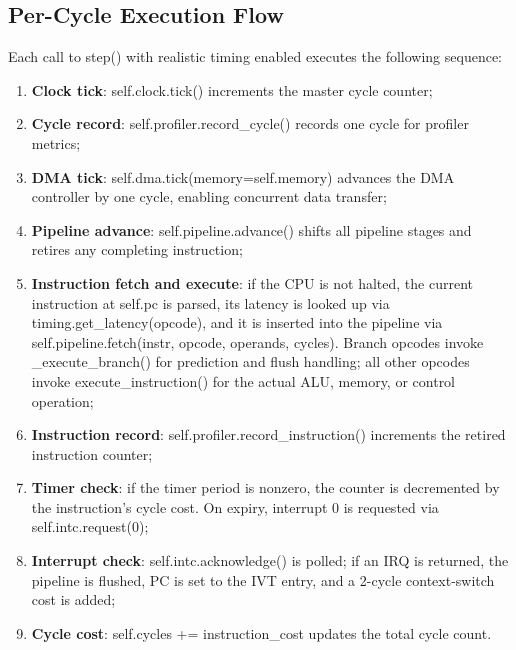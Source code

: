 \documentclass[12pt,a4paper,twoside]{book}
\theoremstyle{trinarytheorem}
\theoremstyle{trinarydefinition}
\newcommand{\code}[1]{\textsf{#1}}
\begin{document}
\subsection{Per-Cycle Execution Flow}

Each call to \code{step()} with realistic timing enabled executes the
following sequence:

\begin{enumerate}
    \item \textbf{Clock tick}: \code{self.clock.tick()} increments the
          master cycle counter;
    \item \textbf{Cycle record}: \code{self.profiler.record\_cycle()}
          records one cycle for profiler metrics;
    \item \textbf{DMA tick}: \code{self.dma.tick(memory=self.memory)}
          advances the DMA controller by one cycle, enabling concurrent
          data transfer;
    \item \textbf{Pipeline advance}: \code{self.pipeline.advance()}
          shifts all pipeline stages and retires any completing instruction;
    \item \textbf{Instruction fetch and execute}: if the CPU is not halted,
          the current instruction at \code{self.pc} is parsed, its latency
          is looked up via \code{timing.get\_latency(opcode)}, and it is
          inserted into the pipeline via
          \code{self.pipeline.fetch(instr, opcode, operands, cycles)}.
          Branch opcodes invoke \code{\_execute\_branch()} for prediction
          and flush handling; all other opcodes invoke
          \code{execute\_instruction()} for the actual ALU, memory, or
          control operation;
    \item \textbf{Instruction record}: \code{self.profiler.record\_instruction()}
          increments the retired instruction counter;
    \item \textbf{Timer check}: if the timer period is nonzero, the counter
          is decremented by the instruction's cycle cost. On expiry,
          interrupt 0 is requested via \code{self.intc.request(0)};
    \item \textbf{Interrupt check}: \code{self.intc.acknowledge()} is
          polled; if an IRQ is returned, the pipeline is flushed, PC is
          set to the IVT entry, and a 2-cycle context-switch cost is added;
    \item \textbf{Cycle cost}: \code{self.cycles += instruction\_cost}
          updates the total cycle count.
\end{enumerate}
\end{document}
